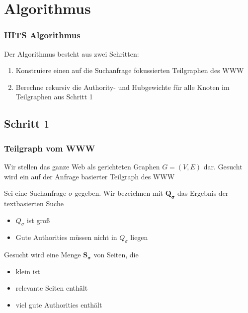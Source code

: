 \documentclass[hyperref={pdfpagelabels=false}]{beamer}
\begin{document}
\section{Algorithmus}

\begin{frame}
\frametitle{HITS Algorithmus}
Der Algorithmus besteht aus zwei Schritten:
\begin{enumerate}
\item Konstruiere einen auf die Suchanfrage fokussierten Teilgraphen des WWW 
\item Berechne rekursiv die Authority- und Hubgewichte für alle Knoten im Teilgraphen aus Schritt 1
\end{enumerate}

\end{frame}


\subsection{Schritt $1$} 
\begin{frame}
\frametitle{Teilgraph vom WWW}
Wir stellen das ganze Web als gerichteten Graphen $G=(V,E)$ dar. Gesucht wird ein auf der Anfrage basierter Teilgraph des WWW

\vspace{10pt}
Sei eine Suchanfrage $\sigma$ gegeben. Wir bezeichnen mit $\mathbf{Q_\sigma}$ das Ergebnis der textbasierten Suche
\begin{itemize}
\item $Q_\sigma$ ist groß
\item Gute Authorities müssen nicht in $Q_\sigma$ liegen
\end{itemize}

\vspace{10pt}

Gesucht wird eine Menge $\mathbf{S_\sigma}$ von Seiten, die
\begin{itemize}
\item klein ist
\item relevante Seiten enthält
\item viel gute Authorities enthält 
\end{itemize}
\end{frame}
\end{document}
